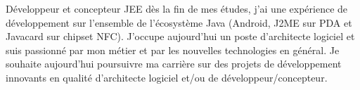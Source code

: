 \par{
    Développeur et concepteur JEE dès la fin de mes études, j'ai une expérience
    de développement sur l'ensemble de l'écosystème Java (Android, J2ME sur PDA et
    Javacard sur chipset NFC). J'occupe aujourd'hui un poste d'architecte logiciel
    et suis passionné par mon métier et par les nouvelles technologies en général.
    Je souhaite aujourd'hui poursuivre ma carrière sur des projets de développement
    innovants en qualité d'architecte logiciel et/ou de développeur/concepteur.
}